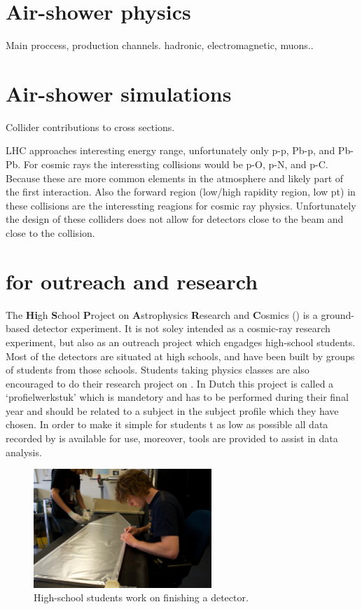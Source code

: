 \section{Air-shower physics}

Main proccess, production channels. hadronic, electromagnetic, muons..


\section{Air-shower simulations}

Collider contributions to cross sections.

LHC approaches interesting energy range, unfortunately only p-p, Pb-p, and Pb-Pb. For cosmic rays the interessting collisions would be p-O, p-N, and p-C. Because these are more common elements in the atmosphere and likely part of the first interaction. Also the forward region (low/high rapidity region, low pt) in these collisions are the interessting reagions for cosmic ray physics. Unfortunately the design of these colliders does not allow for detectors close to the beam and close to the collision.


\section{\hisparc for outreach and research}

The \textbf{Hi}gh \textbf{S}chool \textbf{P}roject on \textbf{A}strophysics \textbf{R}esearch and \textbf{C}osmics (\hisparc) is a ground-based detector experiment. It is not soley intended as a cosmic-ray research experiment, but also as an outreach project which engadges high-school students. Most of the \hisparc detectors are situated at high schools, and have been built by groups of students from those schools. Students taking physics classes are also encouraged to do their research project on \hisparc. In Dutch this project is called a `profielwerkstuk' which is mandetory and has to be performed during their final year and should be related to a subject in the subject profile which they have chosen. In order to make it simple for students t as low as possible all data recorded by \hisparc is available for use, moreover, tools are provided to assist in data analysis.

\begin{figure}
    \centering
    \includegraphics[width=0.6\textwidth]
                    {plots/cosmic-rays/ADL_100352}
    \caption{High-school students work on finishing a detector.}
    \label{fig:detector-bouw}
\end{figure}


